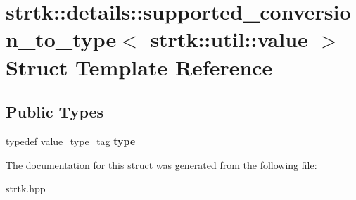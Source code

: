 \hypertarget{structstrtk_1_1details_1_1supported__conversion__to__type_3_01strtk_1_1util_1_1value_01_4}{\section{strtk\-:\-:details\-:\-:supported\-\_\-conversion\-\_\-to\-\_\-type$<$ strtk\-:\-:util\-:\-:value $>$ Struct Template Reference}
\label{structstrtk_1_1details_1_1supported__conversion__to__type_3_01strtk_1_1util_1_1value_01_4}
}
\subsection*{Public Types}
\begin{DoxyCompactItemize}
\item 
\hypertarget{structstrtk_1_1details_1_1supported__conversion__to__type_3_01strtk_1_1util_1_1value_01_4_ab233fafb4abdb34eb00caf7ea7dfaa75}{typedef \hyperlink{structstrtk_1_1details_1_1value__type__tag}{value\-\_\-type\-\_\-tag} {\bfseries type}}\label{structstrtk_1_1details_1_1supported__conversion__to__type_3_01strtk_1_1util_1_1value_01_4_ab233fafb4abdb34eb00caf7ea7dfaa75}

\end{DoxyCompactItemize}


The documentation for this struct was generated from the following file\-:\begin{DoxyCompactItemize}
\item 
strtk.\-hpp\end{DoxyCompactItemize}
